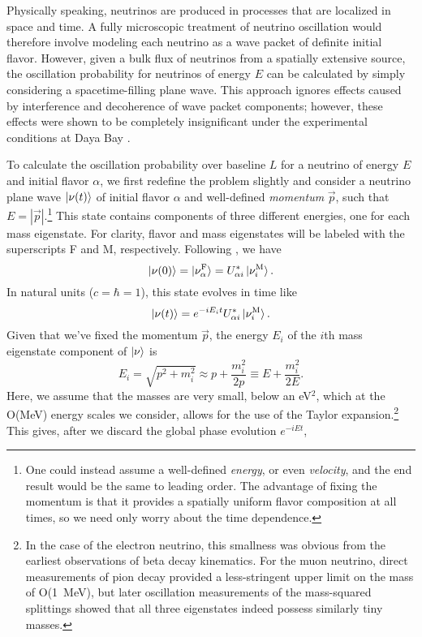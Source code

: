\documentclass[../thesis.tex]{subfiles}
\begin{document}
Physically speaking, neutrinos are produced in processes that are localized in space and time. A fully microscopic treatment of neutrino oscillation would therefore involve modeling each neutrino as a wave packet of definite initial flavor. However, given a bulk flux of neutrinos from a spatially extensive source, the oscillation probability for neutrinos of energy $E$ can be calculated by simply considering a spacetime-filling plane wave. This approach ignores effects caused by interference and decoherence of wave packet components; however, these effects were shown to be completely insignificant under the experimental conditions at Daya Bay \cite{DayaBayWavePacket}.

To calculate the oscillation probability over baseline $L$ for a neutrino of energy $E$ and initial flavor $\alpha$, we first redefine the problem slightly and consider a neutrino plane wave $\ket{\nu(t)}$ of initial flavor $\alpha$ and well-defined \emph{momentum} $\vec{p}$, such that \(E = |\vec{p}|\).\footnote{One could instead assume a well-defined \emph{energy}, or even \emph{velocity}, and the end result would be the same to leading order. The advantage of fixing the momentum is that it provides a spatially uniform flavor composition at all times, so we need only worry about the time dependence.} This state contains components of three different energies, one for each mass eigenstate. For clarity, flavor and mass eigenstates will be labeled with the superscripts F and M, respectively. Following \cite{Giunti_2007}, we have
\begin{equation*}
  \ket{\nu(0)} = \ket{\nu^{\mathrm{F}}_\alpha} = U^*_{\alpha i} \ket{\nu^{\mathrm{M}}_i}. 
\end{equation*}
In natural units ($c = \hbar = 1$), this state evolves in time like
\begin{equation*}
  \ket{\nu(t)} = e^{-i E_i t} U^*_{\alpha i} \ket{\nu^{\mathrm{M}}_i}.
\end{equation*}
Given that we've fixed the momentum $\vec{p}$, the energy $E_i$ of the $i$th mass eigenstate component of $\ket{\nu}$ is
\begin{equation*}
  E_i = \sqrt{p^2 + m_i^2} \approx p + \frac{m_i^2}{2p} \equiv E +
  \frac{m_i^2}{2E}.
\end{equation*}
Here, we assume that the masses are very small, below an eV$^2$, which at the O(MeV) energy scales we consider, allows for the use of the Taylor expansion.\footnote{In the case of the electron neutrino, this smallness was obvious from the earliest observations of beta decay kinematics. For the muon neutrino, direct measurements of pion decay \cite{BOOTH196739} provided a less-stringent upper limit on the mass of O(1~MeV), but later oscillation measurements of the mass-squared splittings showed that all three eigenstates indeed possess similarly tiny masses.} This gives, after we discard the global phase evolution $e^{-iEt}$,
\end{document}
